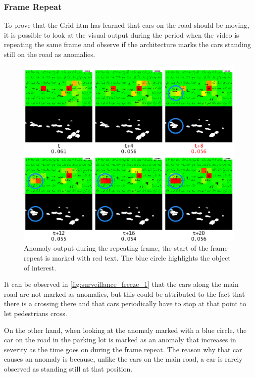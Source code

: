 \subsubsection{Frame Repeat}
To prove that the Grid \gls*{htm} has learned that cars on the road should be moving, it is possible to look at the visual output during the period when the video is repeating the same frame and observe if the architecture marks the cars standing still on the road as anomalies.
\begin{figure}[H]
    \centering
    \includegraphics[width=\textwidth]{resources/experiments/surveillance/surveillance_freeze_1.png}
    \caption[Frame Repeat Anomaly]{Anomaly output during the repeating frame, the start of the frame repeat is marked with red text. The blue circle highlights the object of interest.}
    \label{fig:surveillance_freeze_1}
\end{figure}
It can be observed in \autoref{fig:surveillance_freeze_1} that the cars along the main road are not marked as anomalies, but this could be attributed to the fact that there is a crossing there and that cars periodically have to stop at that point to let pedestrians cross.
\par
On the other hand, when looking at the anomaly marked with a blue circle, the car on the road in the parking lot is marked as an anomaly that increases in severity as the time goes on during the frame repeat. The reason why that car causes an anomaly is because, unlike the cars on the main road, a car is rarely observed as standing still at that position.
